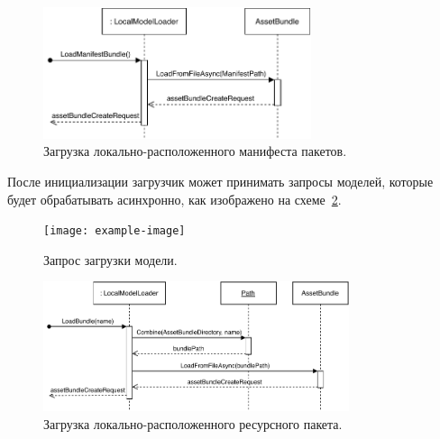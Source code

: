 \begin{figure}[!htp]
    \centering
    \includegraphics[width=0.7\textwidth]{images/UML-SLocalLoadManifestBundle.pdf}
    \caption{Загрузка локально-расположенного манифеста пакетов.}
    \label{figure:SLocalLoadManifestBundle}
\end{figure}

После инициализации загрузчик может принимать запросы моделей,
которые будет обрабатывать асинхронно, как изображено
на схеме~\ref{figure:SModelRequest}.

\begin{figure}[!htp]
    \centering
    \texttt{[image: example-image]}
    \caption{Запрос загрузки модели.}
    \label{figure:SModelRequest}
\end{figure}


\begin{figure}[!htp]
    \centering
    \includegraphics[width=0.8\textwidth]{images/UML-SLocalLoadBundle.pdf}
    \caption{Загрузка локально-расположенного ресурсного пакета.}
    \label{figure:SLocalLoadBundle}
\end{figure}

